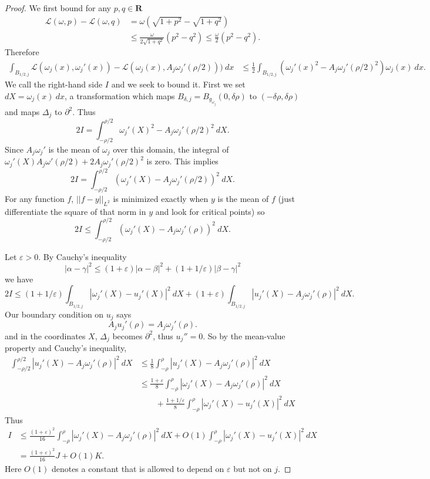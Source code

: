 \documentclass[reqno,12pt,letterpaper]{amsart}
\newcommand{\RR}{\mathbf{R}}
\theoremstyle{definition}
\numberwithin{equation}{section}
\begin{document}
\begin{proof}
We first bound for any $p, q \in \RR$
\begin{align*}
\mathscr L(\omega, p) - \mathscr L(\omega, q) &= \omega(\sqrt{1 + p^2} - \sqrt{1 + q^2}) \\
&\leq \frac{\omega}{2\sqrt{1 + q^2}}(p^2 - q^2) \leq \frac{\omega}{2}(p^2 - q^2).
\end{align*}
Therefore
\begin{align*}
\int_{B_{1/2,j}} \mathscr L(\omega_j(x), \omega_j'(x)) - \mathscr L(\omega_j(x), A_j \omega_j'(\rho/2))) ~dx &\leq \frac{1}{2} \int_{B_{1/2,j}} (\omega_j'(x)^2 - A_j \omega_j'(\rho/2)^2 ) \omega_j(x) ~dx.
\end{align*}
We call the right-hand side $I$ and we seek to bound it.
First we set $dX = \omega_j(x) ~dx$, a transformation which maps $B_{\delta,j} = B_{g_{\omega_j}}(0, \delta\rho)$ to $(-\delta\rho, \delta\rho)$ and maps $\Delta_j$ to $\partial^2$.
Thus
$$2I = \int_{-\rho/2}^{\rho/2} \omega_j'(X)^2 - A_j \omega_j'(\rho/2)^2 ~dX.$$
Since $A_j \omega_j'$ is the mean of $\omega_j$ over this domain, the integral of $\omega_j'(X) A_j\omega'(\rho/2) + 2A_j \omega_j'(\rho/2)^2$ is zero.
This implies
$$2I = \int_{-\rho/2}^{\rho/2} (\omega_j'(X) - A_j \omega_j'(\rho/2))^2 ~dX.$$
For any function $f$, $||f - y||_{L^2}$ is minimized exactly when $y$ is the mean of $f$ (just differentiate the square of that norm in $y$ and look for critical points) so
$$2I \leq \int_{-\rho/2}^{\rho/2} (\omega_j'(X) - A_j \omega_j'(\rho))^2 ~dX.$$

Let $\varepsilon > 0$.
By Cauchy's inequality
$$|\alpha - \gamma|^2 \leq (1 + \varepsilon) |\alpha - \beta|^2 + (1 + 1/\varepsilon) |\beta - \gamma|^2$$
we have
$$2I \leq (1 + 1/\varepsilon) \int_{B_{1/2,j}} |\omega_j'(X) - u_j'(X)|^2 ~dX + (1 + \varepsilon) \int_{B_{1/2,j}} |u_j'(X) - A_j \omega_j'(\rho)|^2 ~dX.$$
Our boundary condition on $u_j$ says
$$A_j u_j'(\rho) = A_j\omega_j'(\rho).$$
and in the coordinates $X$, $\Delta_j$ becomes $\partial^2$, thus $u_j'' = 0$.
So by the mean-value property and Cauchy's inequality,
\begin{align*}
\int_{-\rho/2}^{\rho/2} |u_j'(X) - A_j \omega_j'(\rho)|^2 ~dX &\leq \frac{1}{8} \int_{-\rho}^{\rho} |u_j'(X) - A_j \omega_j'(\rho)|^2 ~dX\\
&\leq \frac{1 + \varepsilon}{8} \int_{-\rho}^\rho |\omega_j'(X) - A_j \omega_j'(\rho)|^2 ~dX \\
&\qquad + \frac{1 + 1/\varepsilon}{8} \int_{-\rho}^\rho |\omega_j'(X) - u_j'(X)|^2 ~dX
\end{align*}
Thus
\begin{align*}
I &\leq \frac{(1 + \varepsilon)^2}{16} \int_{-\rho}^\rho |\omega_j'(X) - A_j \omega_j'(\rho)|^2 ~dX + O(1) \int_{-\rho}^\rho |\omega_j'(X) - u_j'(X)|^2 ~dX\\
&= \frac{(1 + \varepsilon)^2}{16} J + O(1) K.
\end{align*}
Here $O(1)$ denotes a constant that is allowed to depend on $\varepsilon$ but not on $j$.


\end{proof}
\end{document}
